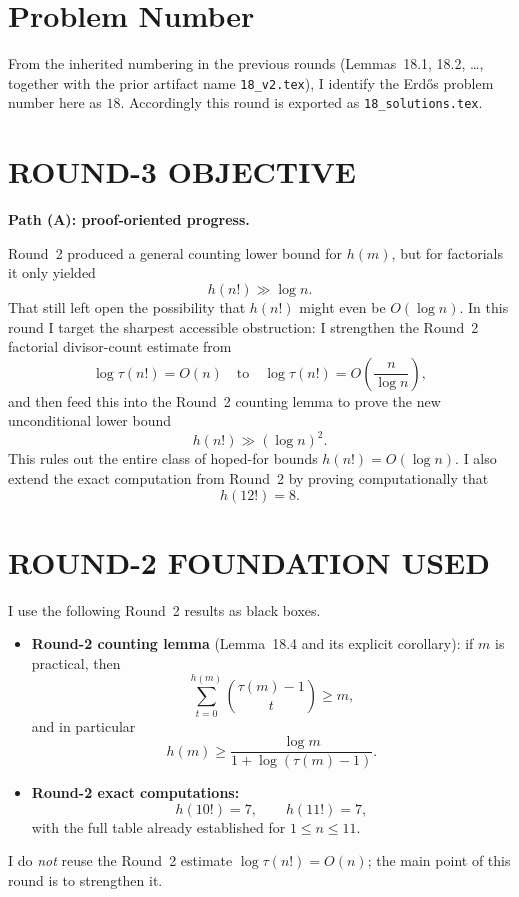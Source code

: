 \section{Problem Number}

From the inherited numbering in the previous rounds (Lemmas~18.1, 18.2, \dots, together with the prior artifact name \texttt{18\_v2.tex}), I identify the Erd\H{o}s problem number here as \(18\). Accordingly this round is exported as \texttt{18\_solutions.tex}.

\section{ROUND-3 OBJECTIVE}

\textbf{Path (A): proof-oriented progress.}

Round~2 produced a general counting lower bound for \(h(m)\), but for factorials it only yielded
\[
h(n!) \gg \log n.
\]
That still left open the possibility that \(h(n!)\) might even be \(O(\log n)\). In this round I target the sharpest accessible obstruction: I strengthen the Round~2 factorial divisor-count estimate from
\[
\log \tau(n!) = O(n)
\quad\text{to}\quad
\log \tau(n!) = O\!\left(\frac{n}{\log n}\right),
\]
and then feed this into the Round~2 counting lemma to prove the new unconditional lower bound
\[
h(n!) \gg (\log n)^2.
\]
This rules out the entire class of hoped-for bounds \(h(n!) = O(\log n)\). I also extend the exact computation from Round~2 by proving computationally that
\[
h(12!) = 8.
\]

\section{ROUND-2 FOUNDATION USED}

I use the following Round~2 results as black boxes.

\begin{itemize}
\item \textbf{Round-2 counting lemma} (Lemma~18.4 and its explicit corollary): if \(m\) is practical, then
\[
\sum_{t=0}^{h(m)} \binom{\tau(m)-1}{t} \ge m,
\]
and in particular
\[
h(m) \ge \frac{\log m}{1+\log(\tau(m)-1)}.
\]
\item \textbf{Round-2 exact computations:}
\[
h(10!)=7,\qquad h(11!)=7,
\]
with the full table already established for \(1\le n\le 11\).
\end{itemize}

I do \emph{not} reuse the Round~2 estimate \(\log\tau(n!)=O(n)\); the main point of this round is to strengthen it.

